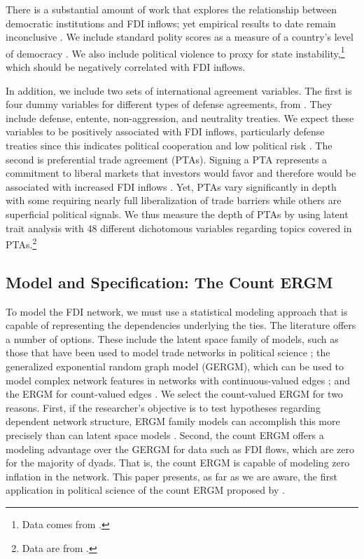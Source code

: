 \documentclass{article}
\begin{document}
There is a substantial amount of work that explores the relationship between democratic institutions and FDI inflows; yet empirical results to date remain inconclusive \citep[see e.g.][]{Henisz:2000,Jensen:2003,Li_Resnick:2003,Jakobsen_DeSoysa:2006,Resnick:2001}. We include standard polity scores as a measure of a country's level of democracy \citep{Marshall_Jaggers:2010}. We also include political violence to proxy for state instability,\footnote{Data comes from \citet{marshall2005major}.} which should be negatively correlated with FDI inflows.

In addition, we include two sets of international agreement variables. The first is four dummy variables for different types of defense agreements, from \citet{Gibler09}. They include defense, entente, non-aggression, and neutrality treaties. We expect these variables to be positively associated with FDI inflows, particularly defense treaties since this indicates political cooperation and low political risk \citep{Li_Vashchilko:2010}. The second is preferential trade agreement (PTAs). Signing a PTA represents a commitment to liberal markets that investors would favor and therefore would be associated with increased FDI inflows \citep{Buthe_Milner:2008,buthe2014foreign}. Yet, PTAs vary significantly in depth with some requiring nearly full liberalization of trade barriers while others are superficial political signals. We thus measure the depth of PTAs by using latent trait analysis with 48 different dichotomous variables regarding topics covered in PTAs.\footnote{Data are from \citet{dur2014design}.}

\subsection{Model and Specification: The Count ERGM}

To model the FDI network, we must use a statistical modeling approach that is capable of representing the dependencies underlying the ties. The literature offers a number of options. These include the latent space family of models, such as those that have been used to model trade networks in political science \citep{ward2007persistent,ward2013gravity}; the generalized exponential random graph model (GERGM), which can be used to model complex network features in networks with continuous-valued edges \citep{desmarais2012statistical,wilson2017stochastic}; and the ERGM for count-valued edges \citep{krivitsky2012exponential}. We select the count-valued ERGM for two reasons. First, if the researcher's objective is to test hypotheses regarding dependent network structure, ERGM family models can accomplish this more precisely than can latent space models \citep{cranmer2016navigating,cranmer2016critique,desmarais2017statistical}. Second, the count ERGM offers a modeling advantage over the GERGM for data such as FDI flows, which are zero for the majority of dyads. That is, the count ERGM is capable of modeling zero inflation in the network. This paper presents, as far as we are aware, the first application in political science of the count ERGM proposed by \cite{krivitsky2012exponential}.
\end{document}
